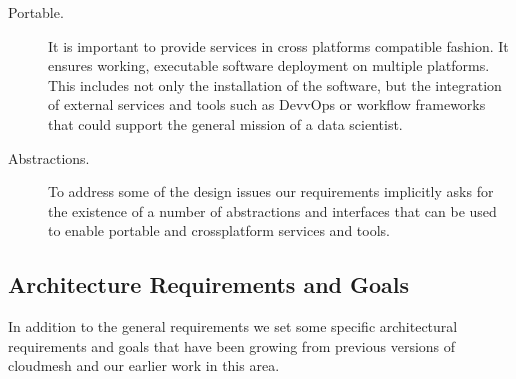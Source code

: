 \documentclass[9pt,twocolumn,twoside]{../../styles/osajnl}
\begin{document}
\begin{description}
\item[Portable.] It is important to provide services in cross
  platforms compatible fashion. It ensures working, executable
  software deployment on multiple platforms. This includes not only
  the installation of the software, but the integration of external
  services and tools such as DevvOps or workflow frameworks that could
  support the general mission of a data scientist.

\item[Abstractions.] To address some of the design issues our
  requirements implicitly asks for the existence of a number of
  abstractions and interfaces that can be used to enable portable and
  crossplatform services and tools.

\end{description}

\subsection{Architecture Requirements and Goals}

In addition to the general requirements we set some specific
architectural requirements and goals that have been growing from
previous versions of cloudmesh and our earlier work in this area.
\end{document}
